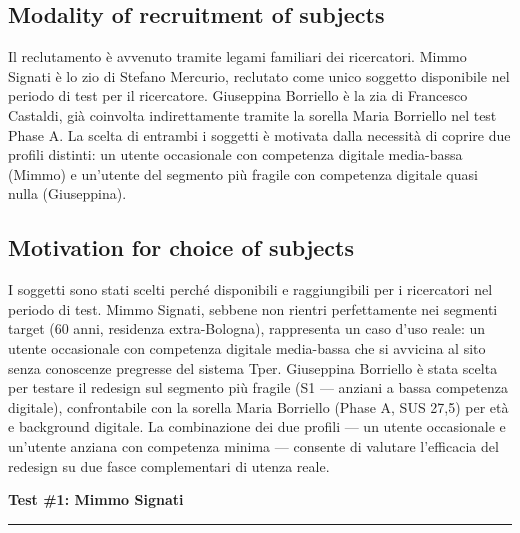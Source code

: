 ﻿\documentclass[11pt,a4paper]{article}
\begin{document}
\subsection*{Modality of recruitment of subjects}
\begin{tcolorbox}[base]
Il reclutamento è avvenuto tramite legami familiari dei
ricercatori. Mimmo Signati è lo zio di Stefano Mercurio,
reclutato come unico soggetto disponibile nel periodo di
test per il ricercatore. Giuseppina Borriello è la zia di
Francesco Castaldi, già coinvolta indirettamente tramite
la sorella Maria Borriello nel test Phase A. La scelta di
entrambi i soggetti è motivata dalla necessità di coprire
due profili distinti: un utente occasionale con competenza
digitale media-bassa (Mimmo) e un'utente del segmento più
fragile con competenza digitale quasi nulla (Giuseppina).
\end{tcolorbox}

\vspace{0.2cm}

\subsection*{Motivation for choice of subjects}
\begin{tcolorbox}[base]
I soggetti sono stati scelti perché disponibili e
raggiungibili per i ricercatori nel periodo di test.
Mimmo Signati, sebbene non rientri perfettamente nei
segmenti target (60 anni, residenza extra-Bologna),
rappresenta un caso d'uso reale: un utente occasionale
con competenza digitale media-bassa che si avvicina al
sito senza conoscenze pregresse del sistema Tper.
Giuseppina Borriello è stata scelta per testare il
redesign sul segmento più fragile (S1 --- anziani a
bassa competenza digitale), confrontabile con la sorella
Maria Borriello (Phase A, SUS 27,5) per età e background
digitale. La combinazione dei due profili --- un utente
occasionale e un'utente anziana con competenza minima ---
consente di valutare l'efficacia del redesign su due
fasce complementari di utenza reale.
\end{tcolorbox}


\newpage
\begin{center}
  {\color{primaryColor}\large\bfseries Test \#1: Mimmo Signati}\\
  \vspace{0.1cm}
  \color{borderColor}\hrule
\end{center}
\end{document}
